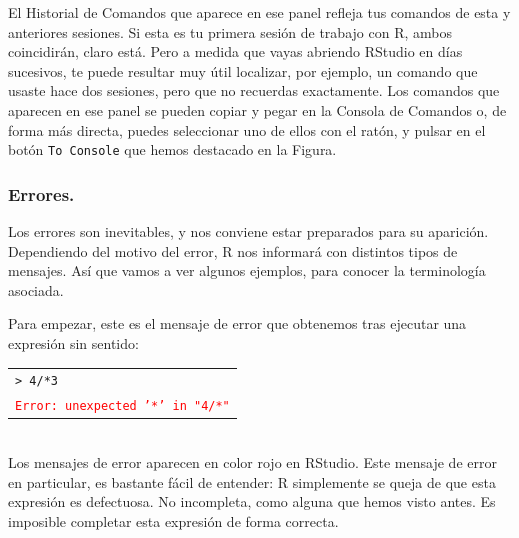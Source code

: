\documentclass[10pt,a4paper]{article}\usepackage[]{graphicx}\usepackage[]{color}
\begin{document}
El Historial de Comandos que aparece en ese panel refleja tus comandos de esta y anteriores sesiones. Si esta es tu primera sesión de trabajo con R, ambos coincidirán, claro está. Pero a medida que vayas abriendo RStudio en días sucesivos, te puede resultar muy útil localizar, por ejemplo, un comando que usaste hace dos sesiones, pero que no recuerdas exactamente. Los comandos que aparecen en ese panel se pueden copiar y pegar en la Consola de Comandos o, de forma más directa, puedes seleccionar uno de ellos con el ratón, y pulsar en el botón {\tt To Console} que hemos destacado en la Figura.

\subsubsection{Errores.}

Los errores son inevitables, y nos conviene estar preparados para su aparición. Dependiendo del motivo del error, R nos informará con distintos tipos de mensajes. Así que vamos a ver algunos ejemplos, para conocer la terminología asociada.

Para empezar, este es el mensaje de error que obtenemos tras ejecutar una expresión sin sentido:\\

\begin{tabular}{l}
{\tt > 4/*3}\\
\textcolor{red}{\tt Error: unexpected '*' in "4/*"{}}
\end{tabular}\\

Los mensajes de error aparecen en color rojo en RStudio. Este mensaje de error en particular, es bastante fácil de entender: R simplemente se queja de que esta expresión es defectuosa. No incompleta, como alguna que hemos visto antes. Es imposible completar esta expresión de forma correcta.
\end{document}
